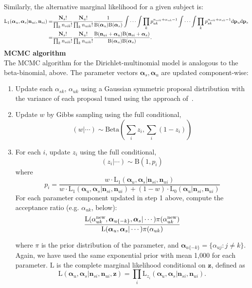 \documentclass{article}
\begin{document}
\noindent Similarly, the alternative marginal likelihood for a given subject is:
\[
\begin{split}
\mathrm{L_1}(\boldsymbol{\alpha}_u,\boldsymbol{\alpha}_s|\mathbf{n}_{ui},\mathbf{n}_{si})
=&\frac{\mathbf{N}_s!}{\prod_k {n}_{sik}!}\frac{\mathbf{N}_u!}{\prod_k {n}_{uik}!}\frac{1}{\mathrm{B}(\boldsymbol{\alpha}_u)\mathrm{B}(\boldsymbol{\alpha}_s)}\idotsint\prod_k p^{n_{uik}+\alpha_{uk}-1}_{uk}\idotsint \prod_k p^{n_{sik}+\alpha_{sk}-1}_{sk}\mathrm{d}\mathbf{p}_u\mathrm{d}\mathbf{p}_s\\
=&\frac{\mathbf{N}_s!}{\prod_k {n}_{sik}!}\frac{\mathbf{N}_u!}{\prod_k {n}_{uik}!}\frac{\mathrm{B}(\mathbf{n}_{ui}+\boldsymbol{\alpha}_u)\mathrm{B}(\mathbf{n}_{si}+\boldsymbol{\alpha}_s)}{\mathrm{B}(\boldsymbol{\alpha}_u)\mathrm{B}(\boldsymbol{\alpha}_s)}.
\end{split}
\]
\noindent\textbf{MCMC algorithm}\\
The MCMC algorithm for the Dirichlet-multinomial model is analogous to the beta-binomial, above. The parameter vectors $\boldsymbol{\alpha}_s,\boldsymbol{\alpha}_u$ are updated component-wise:
\begin{enumerate}
\item  Update each $\alpha_{sk}$, $\alpha_{uk}$ using a Gaussian symmetric proposal distribution with the variance of each proposal tuned using the approach of~\cite{Gelman:2004tc}. 
\item Update $w$ by Gibbs sampling using the full conditional,
\[
(w|\cdots)\sim\mathrm{Beta}(\sum_i z_i,\sum_i(1-z_i))
\]
\item For each $i$, update $z_i$ using the full conditional,
\[
(z_i|\cdots)\sim \mathrm{B}(1,p_i)
\]
where 
\[
p_i = \frac{w\cdot\mathrm{L_1}(\boldsymbol{\alpha}_{u},\boldsymbol{\alpha}_s|\mathbf{n}_{si},\mathbf{n}_{ui})}{w\cdot\mathrm{L_1}(\boldsymbol{\alpha}_{u},\boldsymbol{\alpha}_s|\mathbf{n}_{si},\mathbf{n}_{ui})+(1-w)\cdot\mathrm{L_0}(\boldsymbol{\alpha}_{u}|\mathbf{n}_{si},\mathbf{n}_{ui})}
\]
For each parameter component updated in step 1 above, compute the acceptance ratio (e.g. $\alpha_{uk}$, below):
\[
\frac{\mathrm{L}(\alpha^{\text{new}}_{uk},\boldsymbol{\alpha}_{u\{-k\}},\boldsymbol{\alpha}_s|\cdots)\pi(\alpha^{\text{new}}_{uk})}{\mathrm{L}(\boldsymbol{\alpha}_u,\boldsymbol{\alpha}_s|\cdots)\pi(\alpha_{uk})}\\
\]

where $\pi$ is the prior distribution of the parameter, and $\boldsymbol{\alpha}_{u\{-k\}} = \{\alpha_{uj} :  j\neq k\}$. Again, we have used the same exponential prior with mean 1,000 for each parameter. $\mathrm{L}$ is the complete marginal likelihood conditional on $\mathbf{z}$, defined as
\[
\mathrm{L}(\boldsymbol{\alpha}_u,\boldsymbol{\alpha}_s|\mathbf{n}_{si},\mathbf{n}_{ui},\mathbf{z}) = \prod_i \mathrm{L}_{z_i}(\boldsymbol{\alpha}_u,\boldsymbol{\alpha}_s|\mathbf{n}_{si},\mathbf{n}_{ui}).
\]

\end{enumerate}
\end{document}
